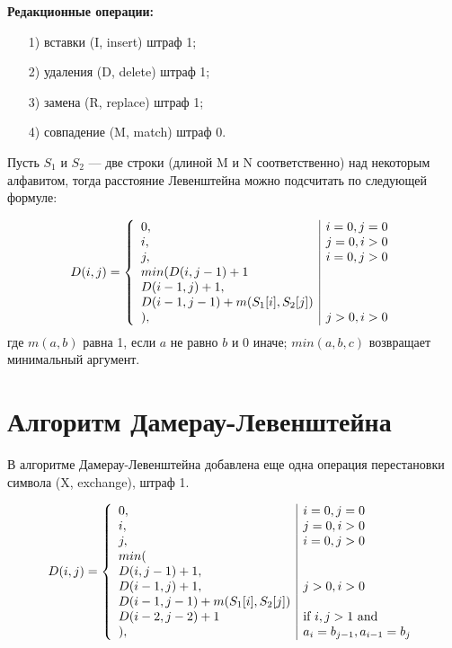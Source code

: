 \documentclass[12pt]{report}
\begin{document}
	\textbf{Редакционные операции:}
	\begin{enumerate}
		\item[1)] вставки (I, insert) штраф 1;
		\item[2)] удаления (D, delete) штраф 1;
		\item[3)] замена (R, replace) штраф 1;
		\item[4)] совпадение (M, match) штраф 0.
	\end{enumerate}
	
	Пусть $S_{1}$ и $S_{2}$ — две строки (длиной M и N соответственно) над некоторым алфавитом, тогда расстояние Левенштейна можно подсчитать по следующей формуле:
	
	\begin{equation}
		D(i,j) = \left\{ \begin{array}{l | l}
			0, & \textrm{$i = 0, j = 0$}\\
			i, & \textrm{$j = 0, i > 0$}\\
			j, & \textrm{$i = 0, j > 0$}\\
			min(D(i,j-1)+1\\
				D(i-1, j) +1,\\
				D(i-1, j-1) + m(S_{1}[i], S_{2}[j])\\
				), &\textrm{$j>0, i>0$}
		\end{array} \right.
	\end{equation}
	где $m(a, b)$ равна 1, если $a$ не равно $b$ и 0 иначе; $min(a, b, c)$ возвращает минимальный аргумент.
	
	\section{Алгоритм Дамерау-Левенштейна}
	В алгоритме Дамерау-Левенштейна добавлена еще одна операция перестановки символа (X, exchange), штраф 1.
	
	\begin{equation}
		D(i,j) = \left\{ \begin{array}{l | l}
			0, & \textrm{$i = 0, j = 0$}\\
			i, & \textrm{$j = 0, i > 0$}\\
			j, & \textrm{$i = 0, j > 0$}\\
			min(\\D(i,j-1)+1,\\
			D(i-1, j) +1, &\textrm{$j>0, i>0$}\\
			D(i-1, j-1) + m(S_{1}[i], S_{2}[j])\\
			D(i-2, j-2) + 1 &\textrm{if $i,j>1$ and} \\
			), & \textrm{$a_{i} = b_{j-1},a_{i-1}=b_{j} $}
		\end{array} \right.
	\end{equation}
	
\end{document}
